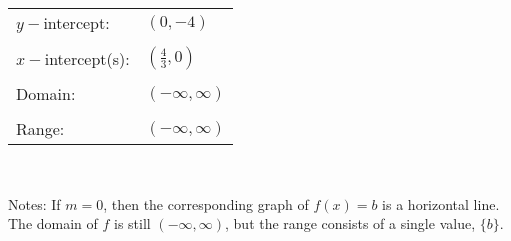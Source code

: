 \documentclass[11pt]{book}
\theoremstyle{definition}  %
\begin{document}
\vspace{0.25in}
\begin{tabular}{ll}
$y-$intercept: & $(0,-4)$\\
&\\
$x-$intercept(s): & $\left(\frac{4}{3},0\right)$\\
&\\
Domain: & $(-\infty,\infty)$\\
&\\
Range: & $(-\infty,\infty)$
\end{tabular}
\\
\vspace{0.25in}

\noindent Notes: If $m=0$, then the corresponding graph of $f(x)=b$ is a horizontal line.  The domain of $f$ is still $(-\infty,\infty)$, but the range consists of a single value, $\{b\}$. 
\newpage
\end{document}

